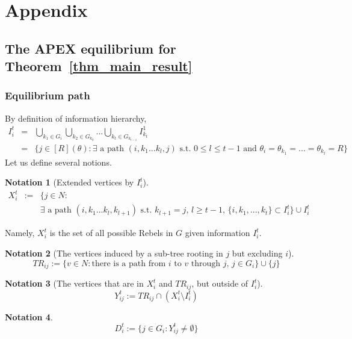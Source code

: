 \documentclass[12pt,letter]{article}
\newtheorem{notation}{Notation}[section]
\theoremstyle{definition}
\theoremstyle{remark}
\theoremstyle{claim}
\begin{document}


\appendix
\section{Appendix}
\subsection{The APEX equilibrium for Theorem~\ref{thm_main_result}}
\subsubsection{Equilibrium path}
\label{sec:equilibrium_path}
By definition of information hierarchy, 
\begin{eqnarray*}
I^t_i & = & \bigcup_{k_1\in G_i}\bigcup_{k_2\in G_{k_0}}...\bigcup_{k_{t}\in G_{k_{t-1}}}I^1_{k_{t}}\\
&= & \{j\in [R](\theta): \text{$\exists$ a path $(i,k_1...k_{l},j)$ s.t.~$0\leq l\leq t-1$ and $\theta_i=\theta_{k_1}=...=\theta_{k_l}=R$}\}
\end{eqnarray*}
Let us define several notions.
\begin{notation}[Extended vertices by $I^t_i$]
\label{def:ext_tree}
\begin{eqnarray*}
X^t_i & := &  \{j\in N: \\
	& & \text{$\exists$ a path $(i,k_1...k_{l},k_{l+1})$ s.t.~$k_{l+1}=j$, $l\geq t-1$, $\{i,k_1,...,k_{t}\}\subset I^t_i$}\}\cup I^t_i
\end{eqnarray*}
\end{notation}
Namely, $X^t_i $ is the set of all possible Rebels in $G$ given information $I^t_i$. 

\begin{notation}[The vertices induced by a sub-tree rooting in $j$ but excluding $i$]
\[TR_{ij}:= \{v\in N:\text{there is a path from $i$ to $v$ through $j$, $j\in G_i$}\}\cup\{j\}\]
\end{notation}


\begin{notation}[The vertices that are in $X^t_i$ and $TR_{ij}$, but outside of $I^t_i$]
\[Y^t_{ij}:= TR_{ij}\cap(X^t_i\setminus I^t_i)\]
\end{notation}


\begin{notation}
\[D^t_{i}:= \{j\in G_i: Y^t_{ij}\neq \emptyset\}\]
\end{notation}
\end{document}
